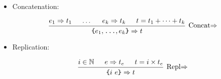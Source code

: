 \documentclass{article}
\renewcommand{\S}{\ensuremath{\Rightarrow}}
\newcommand{\s}[2]{#1 \S{} #2}
\begin{document}
\begin{itemize}[leftmargin=*]
    \item Concatenation:

          \begin{equation*}
              \begin{prooftree}
                  \hypo{\s{e_1}{t_1}}
                  \hypo{\dots}
                  \hypo{\s{e_k}{t_k}}
                  \hypo{t = t_1 + \cdots + t_k}
                  \infer4[Concat\S]{\s{\texttt{\{}e_1, \texttt{\dots}, e_k \texttt{\}}}{t}}
              \end{prooftree}
          \end{equation*}


    \item Replication:

          \begin{equation*}
              \begin{prooftree}
                  \hypo{i \in \mathbb{N}}
                  \hypo{\s{e}{t_e}}
                  \hypo{t = i \times t_e}
                  \infer3[Repl\S]{\s{\texttt{\{}i~e\texttt{\}}}{t}}
              \end{prooftree}
          \end{equation*}
\end{itemize}
\end{document}
